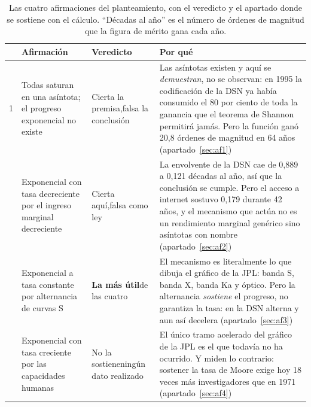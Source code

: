 \documentclass[11pt,letterpaper]{article}
\begin{document}
\begin{table}[b]
\small
\caption{Las cuatro afirmaciones del planteamiento, con el veredicto y el
apartado donde se sostiene con el cálculo. \enquote{Décadas al año} es el
número de órdenes de magnitud que la figura de mérito gana cada año.}
\label{cuadro:ficha}
\begin{tabularx}{\textwidth}{@{}p{0.4cm}>{\raggedright\arraybackslash}p{3.35cm}>{\raggedright\arraybackslash}p{2.5cm}X@{}}
\toprule
& \textbf{Afirmación} & \textbf{Veredicto} & \textbf{Por qué} \\
\midrule
1 & Todas saturan en una asíntota; el progreso exponencial no existe
  & Cierta la premisa,\newline falsa la conclusión
  & Las asíntotas existen y aquí se \emph{demuestran}, no se observan: en 1995
    la codificación de la DSN ya había consumido el 80 por ciento de toda la
    ganancia que el teorema de Shannon permitirá jamás. Pero la función ganó
    20,8 órdenes de magnitud en 64 años (apartado~\ref{sec:af1}) \\
\addlinespace[2pt]
2 & Exponencial con tasa decreciente por el ingreso marginal decreciente
  & Cierta aquí,\newline falsa como ley
  & La envolvente de la DSN cae de 0,889 a 0,121 décadas al año, así que la
    conclusión se cumple. Pero el acceso a internet sostuvo 0,179 durante 42
    años, y el mecanismo que actúa no es un rendimiento marginal genérico sino
    asíntotas con nombre (apartado~\ref{sec:af2}) \\
\addlinespace[2pt]
3 & Exponencial a tasa constante por alternancia de curvas S
  & \textbf{La más útil}\newline de las cuatro
  & El mecanismo es literalmente lo que dibuja el gráfico de la JPL: banda S,
    banda X, banda Ka y óptico. Pero la alternancia \emph{sostiene} el
    progreso, no garantiza la tasa: en la DSN alterna y aun así decelera
    (apartado~\ref{sec:af3}) \\
\addlinespace[2pt]
4 & Exponencial con tasa creciente por las capacidades humanas
  & No la sostiene\newline ningún dato realizado
  & El único tramo acelerado del gráfico de la JPL es el que todavía no ha
    ocurrido. Y \textcite{bloom2020} miden lo contrario: sostener la tasa de
    Moore exige hoy 18 veces más investigadores que en 1971
    (apartado~\ref{sec:af4}) \\
\bottomrule
\end{tabularx}
\end{table}
\end{document}
